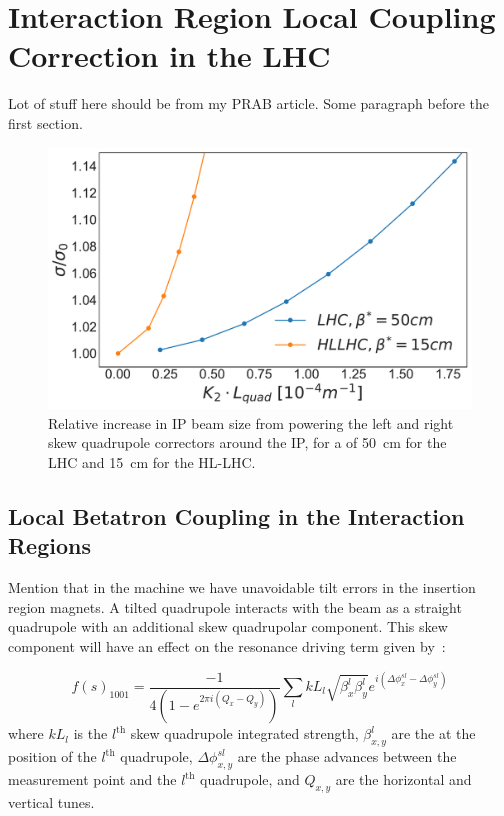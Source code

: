 \chapter{Interaction Region Local Coupling Correction in the LHC} %
\label{Chapter:IR_Local_Coupling} %

Lot of stuff here should be from my PRAB article.
Some paragraph before the first section.

\begin{figure}
    \centering
    \includegraphics*[width=0.9\linewidth]{Figures/Chapter4/lhc_vs_hllhc_ratios_normalised.pdf}
    \caption{Relative increase in IP beam size from powering the left and right skew quadrupole correctors around the IP, for a \betastar of \qty{50}{\centi\metre} for the LHC and \qty{15}{\centi\meter} for the HL-LHC.}
    \label{figure:lhc_vs_hllhc_ratios}
\end{figure}


\section{Local Betatron Coupling in the Interaction Regions}

Mention that in the machine we have unavoidable tilt errors in the insertion region magnets.
A tilted quadrupole interacts with the beam as a straight quadrupole with an additional skew quadrupolar component.
This skew component will have an effect on the \foneohone resonance driving term given by~\cite{PRAB:Calaga:Coupling_Merging_Hamiltonian_Matrix_Approaches}:

\begin{equation}
    f(s)_{1001} = \frac{-1}{4 \left(1 - e^{2 \pi i \left(Q_x - Q_y \right)}\right)} \sum_l k L_l \sqrt{\beta_x^l \beta_y^l} e^{i \left(\Delta \phi_x^{s l} - \Delta \phi_y^{s l}\right)}
    \label{equation:skew_quad_contribution_to_f1001}
\end{equation}
where \(k L_l\) is the \(l^{\mathrm{th}}\) skew quadrupole integrated strength, \(\beta^l_{x,y}\) are the \betafunctions at the position of the \(l^{\mathrm{th}}\) quadrupole, \(\Delta \phi^{sl}_{x,y}\) are the phase advances between the measurement point and the \(l^{\mathrm{th}}\) quadrupole, and \(Q_{x,y}\) are the horizontal and vertical tunes.

